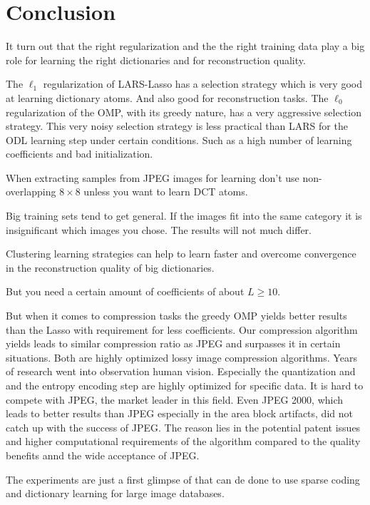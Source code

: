 \chapter{Conclusion}
It turn out that the right regularization and the the right training data
play  a big role for learning the right dictionaries and for reconstruction
quality. 

The $\ell_1$ regularization of LARS-Lasso has a selection strategy
which is very good at learning dictionary atoms. And also good for
reconstruction tasks.  The $\ell_0$ regularization of the OMP, with its greedy
nature, has a very aggressive selection strategy.  This very noisy selection
strategy is less practical than LARS for the ODL learning step under certain
conditions. Such as a high number of learning coefficients and bad
initialization.

When extracting samples from JPEG images for
learning don't use non-overlapping $8 \times 8$ unless you want to learn DCT
atoms. 

Big training sets tend to get general. If the images fit into the same category
it is insignificant which images you chose. The results will not much differ.

Clustering learning strategies can help to learn faster and overcome
convergence in the reconstruction quality of big dictionaries.


But you need a certain amount of coefficients of about $L \ge 10$.

But when it comes to compression tasks the greedy OMP yields better results
than the Lasso with requirement for less coefficients. 
Our compression algorithm yields leads to similar compression ratio as JPEG
and surpasses it in certain situations. Both are highly optimized lossy image
compression algorithms.  Years of research went into observation human vision. 
Especially the quantization and and the entropy encoding step are highly
optimized for specific data. It is hard to compete with JPEG, the market leader
in this field.  Even JPEG 2000, which leads to better results than JPEG
especially in the area block artifacts, did not catch up with the success of
JPEG.  The reason lies in the potential patent issues and higher computational
requirements of the algorithm compared to the quality benefits annd the wide
acceptance of JPEG.


The experiments are just a first glimpse of that can de done to use sparse
coding and dictionary learning for large image databases.



